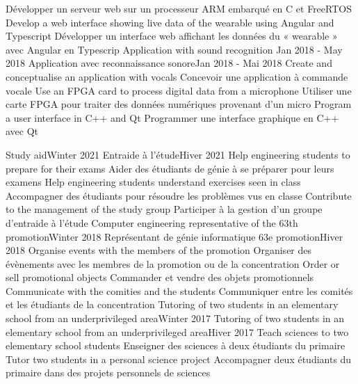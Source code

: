 \documentclass[letterpaper,11pt]{resume}
\begin{document}
                {Développer un serveur web sur un processeur ARM embarqué en C et FreeRTOS}
            \resumeItemEnFr
                {Develop a web interface showing live data of the wearable using Angular and Typescript}
                {Développer un interface web affichant les données du « wearable » avec Angular en Typescrip}
      \resumeProjectHeadingEnFr
          {Application with sound recognition }{Jan 2018 - May 2018}
          {Application avec reconnaissance sonore}{Jan 2018 - Mai 2018}
            \resumeItemEnFr
                {Create and conceptualise an application with vocals}
                {Concevoir une application à commande vocale}
            \resumeItemEnFr
                {Use an FPGA card to process digital data from a microphone}
                {Utiliser une carte FPGA pour traiter des données numériques provenant d’un micro}
            \resumeItemEnFr
                {Program a user interface in C++ and Qt}
                {Programmer une interface graphique en C++ avec Qt}
    \resumeSubHeadingListEnd

    \resumeSubHeadingListStart
      \resumeProjectHeadingEnFr
          {Study aid}{Winter 2021}
          {Entraide à l’étude}{Hiver 2021}
            \resumeItemEnFr
                {Help engineering students to prepare for their exams}
                {Aider des étudiants de génie à se préparer pour leurs examens}
            \resumeItemEnFr
                {Help engineering students understand exercises seen in class}
                {Accompagner des étudiants pour résoudre les problèmes vus en classe}
            \resumeItemEnFr
                {Contribute to the management of the study group}
                {Participer à la gestion d’un groupe d’entraide à l’étude}
      \resumeProjectHeadingEnFr
          {Computer engineering representative of the 63th promotion}{Winter 2018}
          {Représentant de génie informatique 63e promotion}{Hiver 2018}
            \resumeItemEnFr
                {Organise events with the members of the promotion}
                {Organiser des évènements avec les membres de la promotion ou de la concentration}
            \resumeItemEnFr
                {Order or sell promotional objects}
                {Commander et vendre des objets promotionnels}
            \resumeItemEnFr
                {Communicate with the comities and the students}
                {Communiquer entre les comités et les étudiants de la concentration}
      \resumeProjectHeadingEnFr
          {Tutoring of two students in an elementary school from an underprivileged area}{Winter 2017}
          {Tutoring of two students in an elementary school from an underprivileged area}{Hiver 2017}
            \resumeItemEnFr
                {Teach sciences to two elementary school students}
                {Enseigner des sciences à deux étudiants du primaire}
            \resumeItemEnFr
                {Tutor two students in a personal science project}
                {Accompagner deux étudiants du primaire dans des projets personnels de sciences}
    \resumeSubHeadingListEnd
    
\end{document}
